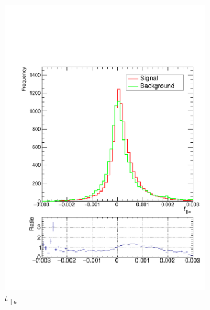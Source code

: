 \documentclass[10pt,a4paper]{book}
\begin{document}
\begin{figure}
\captionsetup[subfigure]{labelformat=empty}
\begin{subfigure}{.33\textwidth}
\centering
\includegraphics[scale=0.25]{truth/tpar1}
\caption{$t_{\parallel a}$}
\end{subfigure}
\begin{subfigure}{0.33\textwidth}
\centering

\end{subfigure}
\end{figure}
\end{document}
